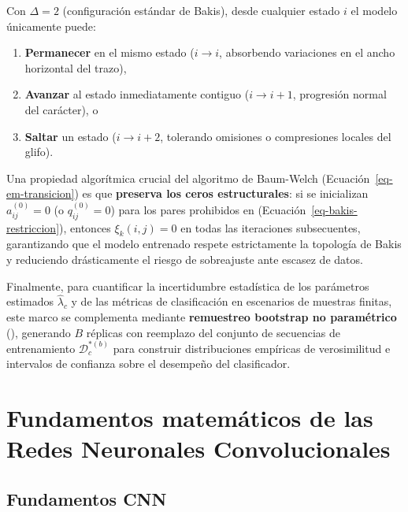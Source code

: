 \documentclass[
  spanish,
  us-letterpaper,
]{scrreprt}
\providecommand{\tightlist}{%
  \setlength{\itemsep}{0pt}\setlength{\parskip}{0pt}}
\theoremstyle{definition}
\theoremstyle{remark}
\begin{document}
Con \(\Delta = 2\) (configuración estándar de Bakis), desde cualquier
estado \(i\) el modelo únicamente puede:

\begin{enumerate}
\def\labelenumi{\arabic{enumi}.}
\tightlist
\item
  \textbf{Permanecer} en el mismo estado (\(i \to i\), absorbendo
  variaciones en el ancho horizontal del trazo),
\item
  \textbf{Avanzar} al estado inmediatamente contiguo (\(i \to i+1\),
  progresión normal del carácter), o
\item
  \textbf{Saltar} un estado (\(i \to i+2\), tolerando omisiones o
  compresiones locales del glifo).
\end{enumerate}

Una propiedad algorítmica crucial del algoritmo de Baum-Welch
(Ecuación~\ref{eq-em-transicion}) es que \textbf{preserva los ceros
estructurales}: si se inicializan \(a_{ij}^{(0)} = 0\) (o
\(q_{ij}^{(0)} = 0\)) para los pares prohibidos en
(Ecuación~\ref{eq-bakis-restriccion}), entonces \(\xi_k(i, j) = 0\) en
todas las iteraciones subsecuentes, garantizando que el modelo entrenado
respete estrictamente la topología de Bakis y reduciendo drásticamente
el riesgo de sobreajuste ante escasez de datos.

Finalmente, para cuantificar la incertidumbre estadística de los
parámetros estimados \(\hat{\lambda}_c\) y de las métricas de
clasificación en escenarios de muestras finitas, este marco se
complementa mediante \textbf{remuestreo bootstrap no paramétrico}
(), generando \(B\)
réplicas con reemplazo del conjunto de secuencias de entrenamiento
\(\mathcal{D}_c^{*(b)}\) para construir distribuciones empíricas de
verosimilitud e intervalos de confianza sobre el desempeño del
clasificador.


\chapter{Fundamentos matemáticos de las Redes Neuronales
Convolucionales}\label{fundamentos-matemuxe1ticos-de-las-redes-neuronales-convolucionales}

\section{Fundamentos CNN}\label{fundamentos-cnn}
\end{document}
